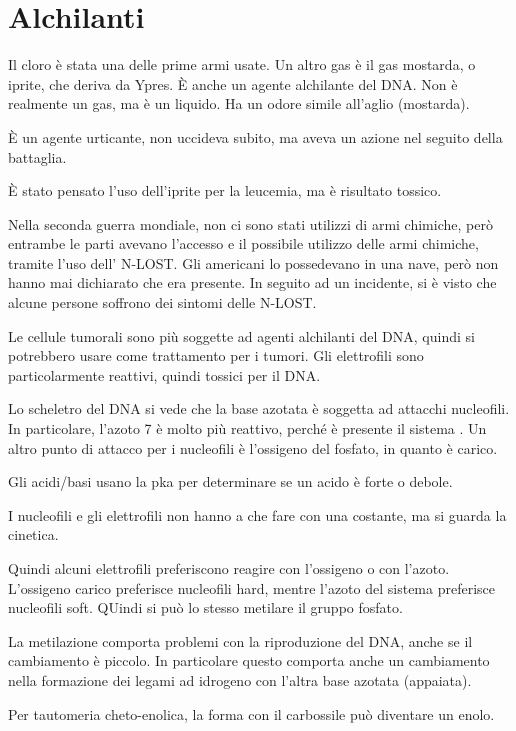 \section{Alchilanti}

Il cloro è stata una delle prime armi usate. Un altro gas è il gas
mostarda, o iprite, che deriva da Ypres. È anche un agente alchilante
del DNA.
Non è realmente un gas, ma è un liquido. Ha un odore simile all'aglio
(mostarda).

È un agente urticante, non uccideva subito, ma aveva un azione nel
seguito della battaglia.

È stato pensato l'uso dell'iprite per la leucemia, ma è risultato
tossico.

Nella seconda guerra mondiale, non ci sono stati utilizzi di armi
chimiche, però entrambe le parti avevano l'accesso e il possibile
utilizzo delle armi chimiche, tramite l'uso dell' N-LOST. Gli americani
lo possedevano in una nave, però non hanno mai dichiarato che era
presente. In seguito ad un incidente, si è visto che alcune persone
soffrono dei sintomi delle N-LOST.

Le cellule tumorali sono più soggette ad agenti alchilanti del DNA,
quindi si potrebbero usare come trattamento per i tumori. Gli
elettrofili sono particolarmente reattivi, quindi tossici per il DNA.

Lo scheletro del DNA si vede che la base azotata è soggetta ad attacchi
nucleofili. In particolare, l'azoto 7 è molto più reattivo, perché è
presente il sistema \pi. Un altro punto di attacco per i nucleofili è
l'ossigeno del fosfato, in quanto è carico.

Gli acidi/basi usano la pka per determinare se un acido è forte o
debole.

I nucleofili e gli elettrofili non hanno a che fare con una costante, ma
si guarda la cinetica.

Quindi alcuni elettrofili preferiscono reagire con l'ossigeno o con
l'azoto. L'ossigeno carico preferisce nucleofili hard, mentre l'azoto
del sistema \pi{} preferisce nucleofili soft. QUindi si può lo stesso
metilare il gruppo fosfato.

La metilazione comporta problemi con la riproduzione del DNA, anche se
il cambiamento è piccolo. In particolare questo comporta anche un
cambiamento nella formazione dei legami ad idrogeno con l'altra base
azotata (appaiata).

Per tautomeria cheto-enolica, la forma con il carbossile può diventare
un enolo.

